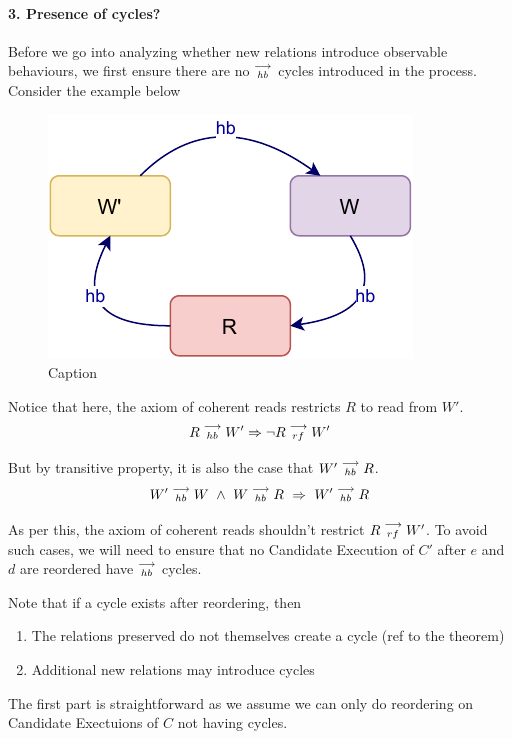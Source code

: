
\paragraph{3. Presence of cycles?}
    Before we go into analyzing whether new relations introduce observable behaviours, we first ensure there are no $\stackrel{\longrightarrow}{_\textit{hb}}$ cycles introduced in the process. Consider the example below
    \begin{figure}[H]
        \centering
        \includegraphics[scale=0.7]{Q4(a).pdf}
        \caption{Caption}
        \label{fig:my_label}
    \end{figure}

    Notice that here, the axiom of coherent reads restricts $R$ to read from $W'$.
    \[
        R\stackrel{\longrightarrow}{_{hb}}W' \Rightarrow \neg R\stackrel{\longrightarrow}{_{rf}}W'
    \]

    But by transitive property, it is also the case that $W'\stackrel{\longrightarrow}{_{hb}}R$. 
    \[
        \reln{W'}{hb}{W} \ \wedge \ \reln{W}{hb}{R} \ 
        \Rightarrow \ 
        \reln{W'}{hb}{R}
    \]

    As per this, the axiom of coherent reads shouldn't restrict $R\stackrel{\longrightarrow}{_{rf}}W'$. To avoid such cases, we will need to ensure that no Candidate Execution of $C'$ after $e$ and $d$ are reordered have $\stackrel{\longrightarrow}{_{hb}}$ cycles.

    Note that if a cycle exists after reordering, then 
    \begin{enumerate}
        \item The relations preserved do not themselves create a cycle (ref to the theorem)
        \item Additional new relations may introduce cycles
    \end{enumerate}

    The first part is straightforward as we assume we can only do reordering on Candidate Exectuions of $C$ not having cycles. 

